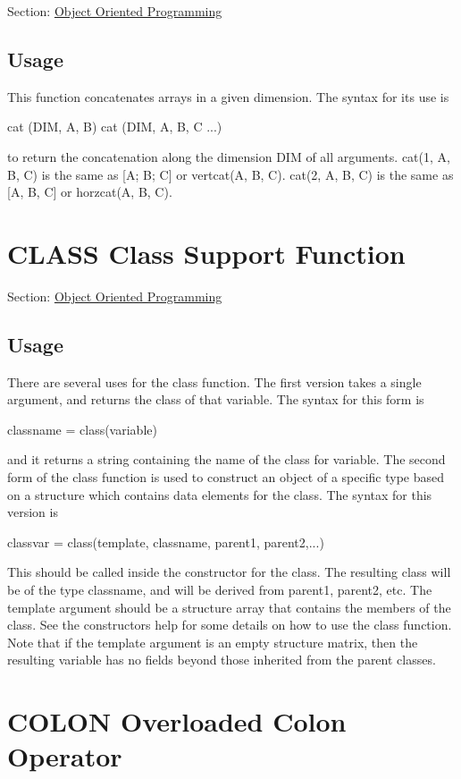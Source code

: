 Section\-: \hyperlink{sec_class}{Object Oriented Programming} \hypertarget{vtkwidgets_vtkxyplotwidget_Usage}{}\subsection{Usage}\label{vtkwidgets_vtkxyplotwidget_Usage}
This function concatenates arrays in a given dimension. The syntax for its use is \begin{DoxyVerb}   cat (DIM, A, B)
   cat (DIM, A, B, C ...)
\end{DoxyVerb}
 to return the concatenation along the dimension {\ttfamily D\-I\-M} of all arguments. {\ttfamily cat(1, A, B, C)} is the same as {\ttfamily \mbox{[}A; B; C\mbox{]}} or {\ttfamily vertcat(\-A, B, C)}. {\ttfamily cat(2, A, B, C)} is the same as {\ttfamily \mbox{[}A, B, C\mbox{]}} or {\ttfamily horzcat(\-A, B, C)}. \hypertarget{class_class}{}\section{C\-L\-A\-S\-S Class Support Function}\label{class_class}
Section\-: \hyperlink{sec_class}{Object Oriented Programming} \hypertarget{vtkwidgets_vtkxyplotwidget_Usage}{}\subsection{Usage}\label{vtkwidgets_vtkxyplotwidget_Usage}
There are several uses for the {\ttfamily class} function. The first version takes a single argument, and returns the class of that variable. The syntax for this form is \begin{DoxyVerb}  classname = class(variable)
\end{DoxyVerb}
 and it returns a string containing the name of the class for {\ttfamily variable}. The second form of the class function is used to construct an object of a specific type based on a structure which contains data elements for the class. The syntax for this version is \begin{DoxyVerb}  classvar = class(template, classname, parent1, parent2,...)
\end{DoxyVerb}
 This should be called inside the constructor for the class. The resulting class will be of the type {\ttfamily classname}, and will be derived from {\ttfamily parent1}, {\ttfamily parent2}, etc. The {\ttfamily template} argument should be a structure array that contains the members of the class. See the {\ttfamily constructors} help for some details on how to use the {\ttfamily class} function. Note that if the {\ttfamily template} argument is an empty structure matrix, then the resulting variable has no fields beyond those inherited from the parent classes. \hypertarget{class_colon}{}\section{C\-O\-L\-O\-N Overloaded Colon Operator}\label{class_colon}

